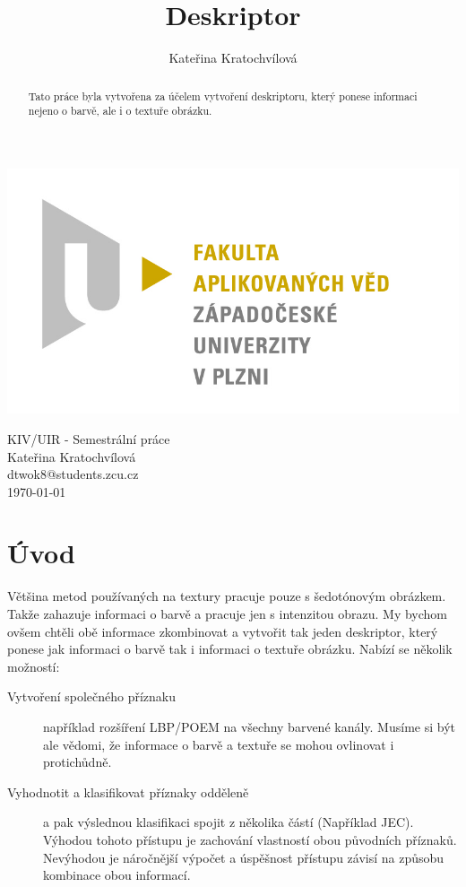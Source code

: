 \documentclass{report}
\title{Deskriptor}
\author{Kateřina Kratochvílová}
\begin{document}
 
\begin{titlepage}
\begin{flushleft} 
{\includegraphics[width=.5\textwidth]{./img/fav_logo.jpg}\\[3cm]}
\end{flushleft}
\begin{center}

{\Huge KIV/UIR - Semestrální práce}
\\[0.3cm]
\vspace{1.7cm}
{\Large Kateřina Kratochvílová} \\
\vspace{0.2cm}
{\normalsize dtwok8@students.zcu.cz}\\

{\large \today}
\end{center}
\end{titlepage}


\tableofcontents
\thispagestyle{empty} %

\begin{abstract}
Tato práce byla vytvořena za účelem vytvoření deskriptoru, který ponese informaci nejeno o barvě, ale i o textuře obrázku. 
\end{abstract}

\chapter{Úvod}
Většina metod používaných na textury pracuje pouze s šedotónovým obrázkem. Takže zahazuje informaci o barvě a pracuje jen s intenzitou obrazu. My bychom ovšem chtěli obě informace zkombinovat a vytvořit tak jeden deskriptor, který ponese jak informaci o barvě tak i informaci o textuře obrázku. Nabízí se několik možností: 

\begin{description}
\item[Vytvoření společného příznaku] 
	například rozšíření LBP/POEM na všechny barvené kanály. Musíme si být ale vědomi, že informace o barvě a textuře se mohou ovlinovat i protichůdně. 

\item[Vyhodnotit a klasifikovat příznaky odděleně] 
	a pak výslednou klasifikaci spojit z několika částí (Například JEC). Výhodou tohoto přístupu je zachování vlastností obou původních příznaků. Nevýhodou je náročnější výpočet a úspěšnost přístupu závisí na způsobu kombinace obou informací.
\end{description} 
\end{document}
